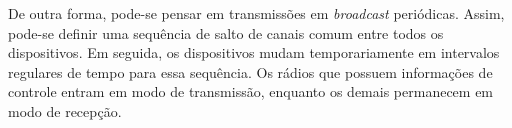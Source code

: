 














De outra forma, pode-se pensar em transmissões em {\it broadcast} periódicas. Assim, pode-se definir uma sequência de salto de canais comum entre todos os dispositivos. Em seguida, os dispositivos mudam temporariamente em intervalos regulares de tempo para essa sequência. Os rádios que possuem informações de controle entram em modo de transmissão, enquanto os demais permanecem em modo de recepção.

